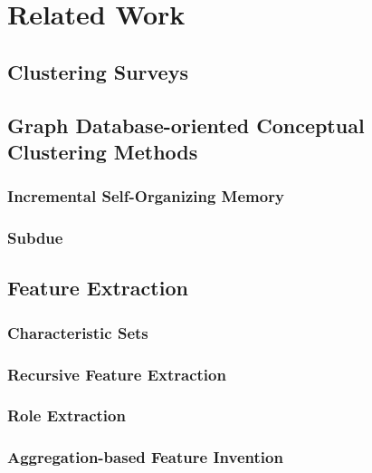  



\section{Related Work}
\subsection{Clustering Surveys}

\subsection{Graph Database-oriented Conceptual Clustering Methods}
\subsubsection{Incremental Self-Organizing Memory}
\subsubsection{Subdue}

\subsection{Feature Extraction}
\subsubsection{Characteristic Sets}
\subsubsection{Recursive Feature Extraction}
\subsubsection{Role Extraction}
\subsubsection{Aggregation-based Feature Invention}


